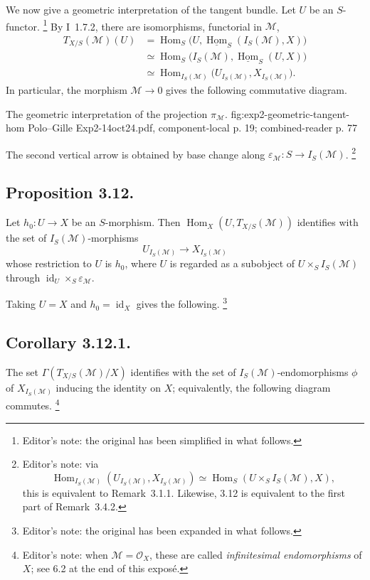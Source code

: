 We now give a geometric interpretation of the tangent bundle. Let \(U\)
be an \(S\)-functor.
\footnote{Editor's note: the original has been simplified in what
follows.}
By I~1.7.2, there are isomorphisms, functorial in
\(\mathcal M\),
\begin{align*}
  T_{X/S}(\mathcal M)(U)
  &=\operatorname{Hom}_S
    \bigl(U,\underline{\operatorname{Hom}}_S(I_S(\mathcal M),X)\bigr)\\
  &\simeq\operatorname{Hom}_S
    \bigl(I_S(\mathcal M),\underline{\operatorname{Hom}}_S(U,X)\bigr)\\
  &\simeq\operatorname{Hom}_{I_S(\mathcal M)}
    \bigl(U_{I_S(\mathcal M)},X_{I_S(\mathcal M)}\bigr).
\end{align*}
In particular, the morphism \(\mathcal M\to0\) gives the following
commutative diagram.

  {The geometric interpretation of the projection \(\pi_{\mathcal M}\).}
  {fig:exp2-geometric-tangent-hom}
  {Polo--Gille Exp2-14oct24.pdf, component-local p. 19; combined-reader p. 77}

The second vertical arrow is obtained by base change along
\(\varepsilon_{\mathcal M}:S\to I_S(\mathcal M)\).
\footnote{Editor's note: via
\[
  \operatorname{Hom}_{I_S(\mathcal M)}
    (U_{I_S(\mathcal M)},X_{I_S(\mathcal M)})
  \simeq\operatorname{Hom}_S(U\times_SI_S(\mathcal M),X),
\]
this is equivalent to Remark~3.1.1. Likewise, 3.12 is equivalent to the
first part of Remark~3.4.2.}

\subsection*{Proposition 3.12.}
Let \(h_0:U\to X\) be an \(S\)-morphism. Then
\(\operatorname{Hom}_X(U,T_{X/S}(\mathcal M))\) identifies with the set of
\(I_S(\mathcal M)\)-morphisms
\[
  U_{I_S(\mathcal M)}\longrightarrow X_{I_S(\mathcal M)}
\]
whose restriction to \(U\) is \(h_0\), where \(U\) is regarded as a
subobject of \(U\times_SI_S(\mathcal M)\) through
\(\operatorname{id}_U\times_S\varepsilon_{\mathcal M}\).

Taking \(U=X\) and \(h_0=\operatorname{id}_X\) gives the following.
\footnote{Editor's note: the original has been expanded in what follows.}

\subsection*{Corollary 3.12.1.}
The set \(\Gamma(T_{X/S}(\mathcal M)/X)\) identifies with the set of
\(I_S(\mathcal M)\)-endomorphisms \(\phi\) of
\(X_{I_S(\mathcal M)}\) inducing the identity on \(X\); equivalently,
the following diagram commutes.
\footnote{Editor's note: when \(\mathcal M=\mathcal O_X\), these are
called \emph{infinitesimal endomorphisms} of \(X\); see 6.2 at the end of
this expos\'e.}

